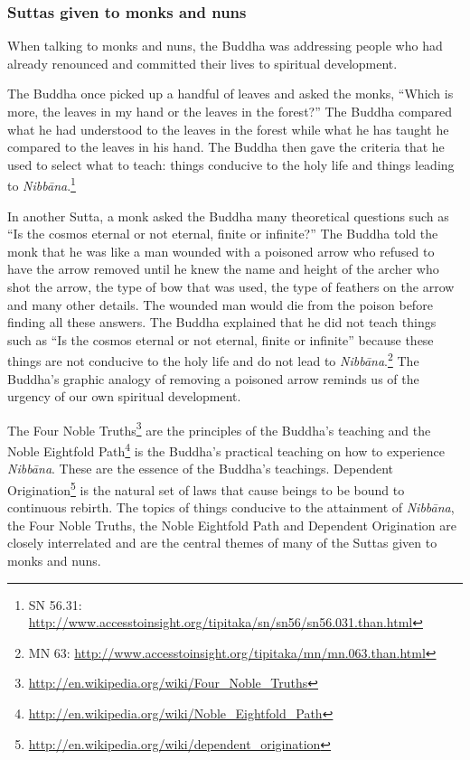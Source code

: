 \subsubsection*{Suttas given to monks and nuns}

When talking to monks and nuns, the Buddha was addressing people who had already renounced and committed their lives to spiritual development.

The Buddha once picked up a handful of leaves and asked the monks, “Which is more, the leaves in my hand or the leaves in the forest?” The Buddha compared what he had understood to the leaves in the forest while what he has taught he compared to the leaves in his hand. The Buddha then gave the criteria that he used to select what to teach: things conducive to the holy life and things leading to \textit{Nibbāna}.\footnote{SN 56.31: \url{http://www.accesstoinsight.org/tipitaka/sn/sn56/sn56.031.than.html}}

In another Sutta, a monk asked the Buddha many theoretical questions such as “Is the cosmos eternal or not eternal, finite or infinite?” The Buddha told the monk that he was like a man wounded with a poisoned arrow who refused to have the arrow removed until he knew the name and height of the archer who shot the arrow, the type of bow that was used, the type of feathers on the arrow and many other details. The wounded man would die from the poison before finding all these answers. The Buddha explained that he did not teach things such as “Is the cosmos eternal or not eternal, finite or infinite” because these things are not conducive to the holy life and do not lead to \textit{Nibbāna}.\footnote{MN 63: \url{http://www.accesstoinsight.org/tipitaka/mn/mn.063.than.html}} The Buddha’s graphic analogy of removing a poisoned arrow reminds us of the urgency of our own spiritual development.

The Four Noble Truths\footnote{\url{http://en.wikipedia.org/wiki/Four_Noble_Truths}} are the principles of the Buddha’s teaching and the Noble Eightfold Path\footnote{\url{http://en.wikipedia.org/wiki/Noble_Eightfold_Path}} is the Buddha’s practical teaching on how to experience \textit{Nibbāna}. These are the essence of the Buddha’s teachings. Dependent Origination\footnote{\url{http://en.wikipedia.org/wiki/dependent_origination}} is the natural set of laws that cause beings to be bound to continuous rebirth. The topics of things conducive to the attainment of \textit{Nibbāna}, the Four Noble Truths, the Noble Eightfold Path and Dependent Origination are closely interrelated and are the central themes of many of the Suttas given to monks and nuns.


